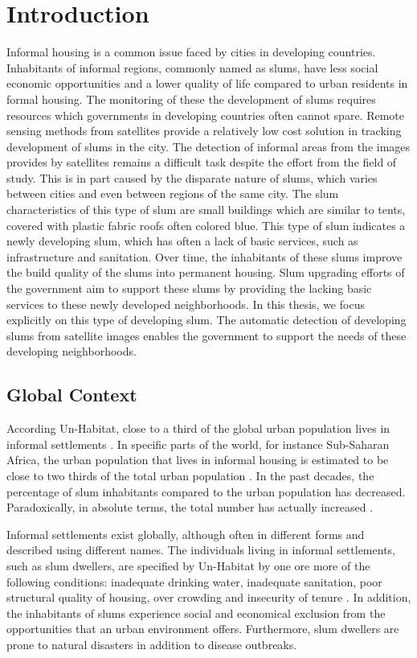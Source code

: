 \section{Introduction}

Informal housing is a common issue faced by cities in developing countries. Inhabitants of informal regions, commonly named as slums, have less social economic opportunities and a lower quality of life compared to urban residents in formal housing. The monitoring of these the development of slums requires resources which governments in developing countries often cannot spare. Remote sensing methods from satellites provide a relatively low cost solution in tracking development of slums in the city. The detection of informal areas from the images provides by satellites remains a difficult task despite the effort from the field of study. This is in part caused by the disparate nature of slums, which varies between cities and even between regions of the same city. The slum characteristics of this type of slum are small buildings which are similar to tents, covered with plastic fabric roofs often colored blue. This type of slum indicates a newly developing slum, which has often a lack of basic services, such as infrastructure and sanitation. Over time, the inhabitants of these slums improve the build quality of the slums into permanent housing. Slum upgrading efforts of the government aim to support these slums by providing the lacking basic services to these newly developed neighborhoods. In this thesis, we focus explicitly on this type of developing slum. The automatic detection of developing slums from satellite images enables the government to support the needs of these developing neighborhoods.

\subsection{Global Context}
According Un-Habitat, close to a third of the global urban population lives in informal settlements \cite{2016state}. In specific parts of the world, for instance Sub-Saharan Africa, the urban population that lives in informal housing is estimated to be close to two thirds of the total urban population \cite{un2013planning}. In the past decades, the percentage of slum inhabitants compared to the urban population has decreased. Paradoxically, in absolute terms, the total number has actually increased \cite{2016state}.

Informal settlements exist globally, although often in different forms and described using different names. The individuals living in informal settlements, such as slum dwellers, are specified by Un-Habitat by one ore more of the following conditions: inadequate  drinking  water,  inadequate  sanitation, poor  structural quality of housing, over crowding and insecurity of tenure \cite{un2015slum}. In addition, the inhabitants of slums experience social and economical exclusion from the opportunities that an urban environment offers. Furthermore, slum dwellers are prone to natural disasters in addition to disease outbreaks. 

